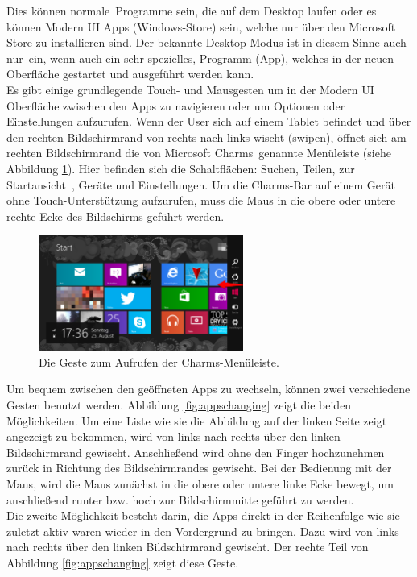 \documentclass[12pt,a4paper,bibtotoc,abstracton]{scrartcl}
\begin{document}
Dies können \glqq normale\grqq\ Programme sein, die auf dem Desktop laufen oder es können Modern UI Apps (Windows-Store) sein, welche nur über den Microsoft Store zu installieren sind. Der bekannte Desktop-Modus ist in diesem Sinne auch \glqq nur\grqq\ ein, wenn auch ein sehr spezielles, Programm (App), welches in der neuen Oberfläche gestartet und ausgeführt werden kann.\\
Es gibt einige grundlegende Touch- und Mausgesten um in der Modern UI Oberfläche zwischen den Apps zu navigieren oder um Optionen oder Einstellungen aufzurufen. Wenn der User sich auf einem Tablet befindet und über den rechten Bildschirmrand von rechts nach links wischt (swipen), öffnet sich am rechten Bildschirmrand die von Microsoft \glqq Charms\grqq\ genannte Menüleiste (siehe Abbildung \ref{fig:charms}). Hier befinden sich die Schaltflächen: Suchen, Teilen, \glqq zur Startansicht\grqq\ , Geräte und Einstellungen. Um die Charms-Bar auf einem Gerät ohne Touch-Unterstützung aufzurufen, muss die Maus in die obere oder untere rechte Ecke des Bildschirms geführt werden. 

\begin{figure}[h]	
	\centering
	\includegraphics[width=0.6\textwidth]{Bilder/Screenshots/windows8/charm_bar.png} 
	\caption{Die Geste zum Aufrufen der Charms-Menüleiste.}
	\label{fig:charms}
\end{figure}  

Um bequem zwischen den geöffneten Apps zu wechseln, können zwei verschiedene Gesten benutzt werden. Abbildung \ref{fig:appschanging} zeigt die beiden Möglichkeiten. Um eine Liste wie sie die Abbildung auf der linken Seite zeigt angezeigt zu bekommen, wird von links nach rechts über den linken Bildschirmrand gewischt. Anschließend wird ohne den Finger hochzunehmen zurück in Richtung des Bildschirmrandes gewischt. Bei der Bedienung mit der Maus, wird die Maus zunächst in die obere oder untere linke Ecke bewegt, um anschließend runter bzw. hoch zur Bildschirmmitte geführt zu werden.\\
Die zweite Möglichkeit besteht darin, die Apps direkt in der Reihenfolge wie sie zuletzt aktiv waren wieder in den Vordergrund zu bringen. Dazu wird von links nach rechts über den linken Bildschirmrand gewischt. Der rechte Teil von Abbildung \ref{fig:appschanging} zeigt diese Geste.
 
\end{document}
